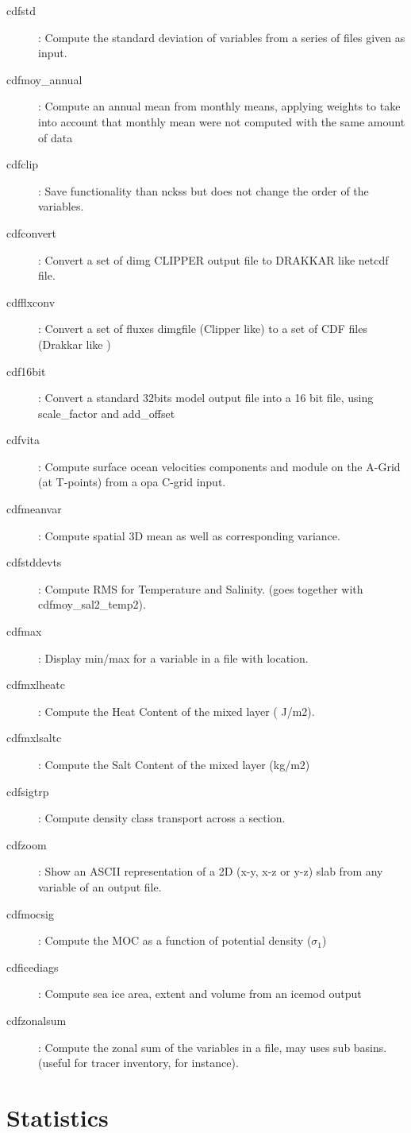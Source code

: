 \documentclass[a4paper,11pt]{article}
\begin{document}
\begin{description}
\item[cdfstd] : Compute the standard deviation of variables from a series of files given as input.
\item[cdfmoy\_annual] : Compute an annual mean from monthly means, applying weights to take into account that monthly mean were not computed 
                          with the same amount of data
\item[cdfclip] : Save functionality than nckss but does not change the order of the variables.
\item[cdfconvert] : Convert a set of dimg CLIPPER output file to DRAKKAR like netcdf file.
\item[cdfflxconv] : Convert a set of fluxes dimgfile (Clipper like) to a set of CDF files (Drakkar like )
\item[cdf16bit] : Convert a standard 32bits model output file into a 16 bit file, using scale\_factor and add\_offset
\item[cdfvita] : Compute surface ocean velocities components and module on the A-Grid (at T-points) from a opa C-grid input.
\item[cdfmeanvar] : Compute spatial 3D mean as well as corresponding variance.
\item[cdfstddevts] : Compute RMS for Temperature and Salinity. (goes together with cdfmoy\_sal2\_temp2).
\item[cdfmax] : Display min/max for a variable in a file with location.
\item[cdfmxlheatc] : Compute the Heat Content of the mixed layer ( J/m2).
\item[cdfmxlsaltc] : Compute the Salt Content of the mixed layer (kg/m2)
\item[cdfsigtrp] : Compute density class transport across a section.
\item[cdfzoom] : Show an ASCII representation of a 2D (x-y, x-z or y-z) slab from any variable of an output file.
\item[cdfmocsig] : Compute the MOC as a function of potential density ($\sigma_1$)
\item[cdficediags]: Compute sea ice area, extent and volume from an icemod output
\item[cdfzonalsum] : Compute the zonal sum of the variables in a file, may uses sub basins.
                      (useful for tracer inventory, for instance).
\end{description}

\newpage
\section{Statistics}
\end{document}
